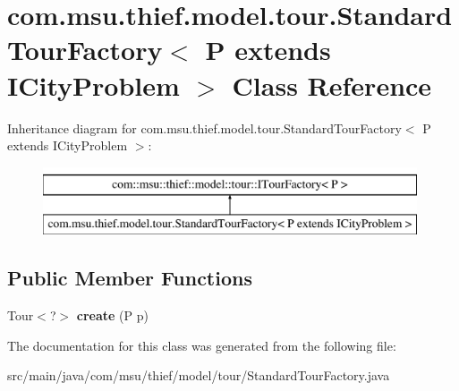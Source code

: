 \hypertarget{classcom_1_1msu_1_1thief_1_1model_1_1tour_1_1StandardTourFactory_3_01P_01extends_01ICityProblem_01_4}{\section{com.\-msu.\-thief.\-model.\-tour.\-Standard\-Tour\-Factory$<$ P extends I\-City\-Problem $>$ Class Reference}
\label{classcom_1_1msu_1_1thief_1_1model_1_1tour_1_1StandardTourFactory_3_01P_01extends_01ICityProblem_01_4}
}
Inheritance diagram for com.\-msu.\-thief.\-model.\-tour.\-Standard\-Tour\-Factory$<$ P extends I\-City\-Problem $>$\-:\begin{figure}[H]
\begin{center}
\leavevmode
\includegraphics[height=2.000000cm]{classcom_1_1msu_1_1thief_1_1model_1_1tour_1_1StandardTourFactory_3_01P_01extends_01ICityProblem_01_4}
\end{center}
\end{figure}
\subsection*{Public Member Functions}
\begin{DoxyCompactItemize}
\item 
\hypertarget{classcom_1_1msu_1_1thief_1_1model_1_1tour_1_1StandardTourFactory_3_01P_01extends_01ICityProblem_01_4_a3fbbe36b85b38e3b73db96d3318793ba}{Tour$<$?$>$ {\bfseries create} (P p)}\label{classcom_1_1msu_1_1thief_1_1model_1_1tour_1_1StandardTourFactory_3_01P_01extends_01ICityProblem_01_4_a3fbbe36b85b38e3b73db96d3318793ba}

\end{DoxyCompactItemize}


The documentation for this class was generated from the following file\-:\begin{DoxyCompactItemize}
\item 
src/main/java/com/msu/thief/model/tour/Standard\-Tour\-Factory.\-java\end{DoxyCompactItemize}
